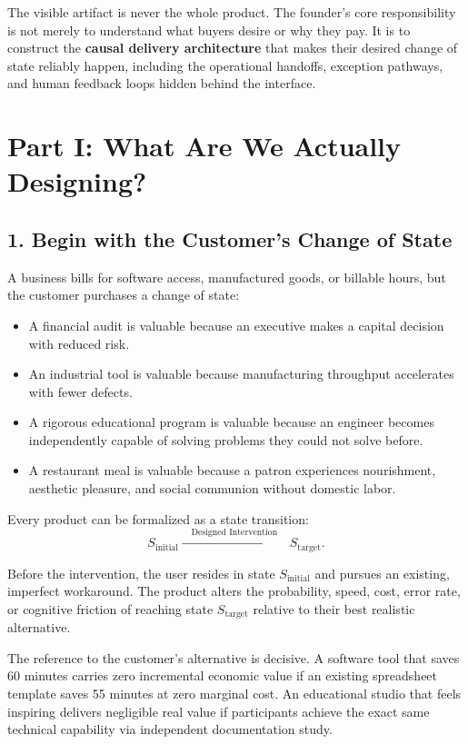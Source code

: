 The visible artifact is never the whole product. The founder's core responsibility is not merely to understand what buyers desire or why they pay. It is to construct the \textbf{causal delivery architecture} that makes their desired change of state reliably happen, including the operational handoffs, exception pathways, and human feedback loops hidden behind the interface.

\section*{Part I: What Are We Actually Designing?}

\subsection*{1. Begin with the Customer's Change of State}

A business bills for software access, manufactured goods, or billable hours, but the customer purchases a change of state:
\begin{itemize}
    \item A financial audit is valuable because an executive makes a capital decision with reduced risk.
    \item An industrial tool is valuable because manufacturing throughput accelerates with fewer defects.
    \item A rigorous educational program is valuable because an engineer becomes independently capable of solving problems they could not solve before.
    \item A restaurant meal is valuable because a patron experiences nourishment, aesthetic pleasure, and social communion without domestic labor.
\end{itemize}

Every product can be formalized as a state transition:
\begin{equation}
S_{\text{initial}} \xrightarrow{\quad\text{Designed Intervention}\quad} S_{\text{target}}.
\end{equation}

Before the intervention, the user resides in state $S_{\text{initial}}$ and pursues an existing, imperfect workaround. The product alters the probability, speed, cost, error rate, or cognitive friction of reaching state $S_{\text{target}}$ relative to their best realistic alternative.

The reference to the customer's alternative is decisive. A software tool that saves 60 minutes carries zero incremental economic value if an existing spreadsheet template saves 55 minutes at zero marginal cost. An educational studio that feels inspiring delivers negligible real value if participants achieve the exact same technical capability via independent documentation study.

